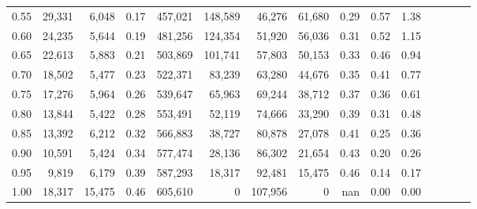 \begin{tabular}{rrrcrrrrrrrrrrr}
0.55 &  29,331 &   6,048 &                                       0.17 &  457,021 &  148,589 &   46,276 &   61,680 &  0.29 &  0.57 &                         1.38 \\
0.60 &  24,235 &   5,644 &                                       0.19 &  481,256 &  124,354 &   51,920 &   56,036 &  0.31 &  0.52 &                         1.15 \\
0.65 &  22,613 &   5,883 &                                       0.21 &  503,869 &  101,741 &   57,803 &   50,153 &  0.33 &  0.46 &                         0.94 \\
0.70 &  18,502 &   5,477 &                                       0.23 &  522,371 &   83,239 &   63,280 &   44,676 &  0.35 &  0.41 &                         0.77 \\
0.75 &  17,276 &   5,964 &                                       0.26 &  539,647 &   65,963 &   69,244 &   38,712 &  0.37 &  0.36 &                         0.61 \\
0.80 &  13,844 &   5,422 &                                       0.28 &  553,491 &   52,119 &   74,666 &   33,290 &  0.39 &  0.31 &                         0.48 \\
0.85 &  13,392 &   6,212 &                                       0.32 &  566,883 &   38,727 &   80,878 &   27,078 &  0.41 &  0.25 &                         0.36 \\
0.90 &  10,591 &   5,424 &                                       0.34 &  577,474 &   28,136 &   86,302 &   21,654 &  0.43 &  0.20 &                         0.26 \\
0.95 &   9,819 &   6,179 &                                       0.39 &  587,293 &   18,317 &   92,481 &   15,475 &  0.46 &  0.14 &                         0.17 \\
1.00 &  18,317 &  15,475 &                                       0.46 &  605,610 &        0 &  107,956 &        0 &   nan &  0.00 &                         0.00 \\
\bottomrule
\end{tabular}
